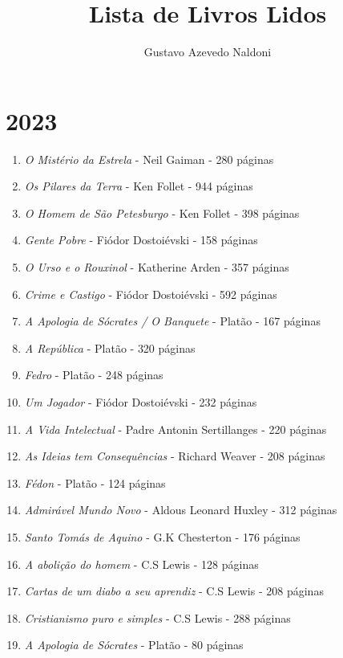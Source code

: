 \documentclass[a4paper, twoside]{article}
\title{Lista de Livros Lidos}
\author{Gustavo Azevedo Naldoni}
\begin{document}
\pagestyle{fancy}
\fancyhead{}
\fancyfoot{}
\maketitle
\tableofcontents
\newpage
\section{2023}
\begin{enumerate}
\item{\emph{O Mistério da Estrela} - Neil Gaiman - 280 páginas}
\item{\emph{Os Pilares da Terra} - Ken Follet - 944 páginas}
\item{\emph{O Homem de São Petesburgo} - Ken Follet - 398 páginas}
\item{\emph{Gente Pobre} - Fiódor Dostoiévski - 158 páginas}
\item{\emph{O Urso e o Rouxinol} - Katherine Arden - 357 páginas}
\item{\emph{Crime e Castigo} - Fiódor Dostoiévski - 592 páginas}
\item{\emph{A Apologia de Sócrates / O Banquete} - Platão - 167 páginas}
\item{\emph{A República} - Platão - 320 páginas}
\item{\emph{Fedro} - Platão - 248 páginas}
\item{\emph{Um Jogador} - Fiódor Dostoiévski - 232 páginas}
\item{\emph{A Vida Intelectual} - Padre Antonin Sertillanges - 220 páginas}
\item{\emph{As Ideias tem Consequências} - Richard Weaver - 208 páginas}
\item{\emph{Fédon} - Platão - 124 páginas}
\item{\emph{Admirável Mundo Novo} - Aldous Leonard Huxley - 312 páginas}
\item{\emph{Santo Tomás de Aquino} - G.K Chesterton - 176 páginas}
\item{\emph{A abolição do homem} - C.S Lewis - 128 páginas}
\item{\emph{Cartas de um diabo a seu aprendiz} - C.S Lewis - 208 páginas}
\item{\emph{Cristianismo puro e simples} - C.S Lewis - 288 páginas}
\item{\emph{A Apologia de Sócrates} - Platão - 80 páginas}

\end{enumerate}
\end{document}
